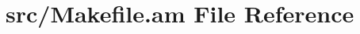 \hypertarget{src_2_makefile_8am}{}\section{src/\+Makefile.am File Reference}
\label{src_2_makefile_8am}
